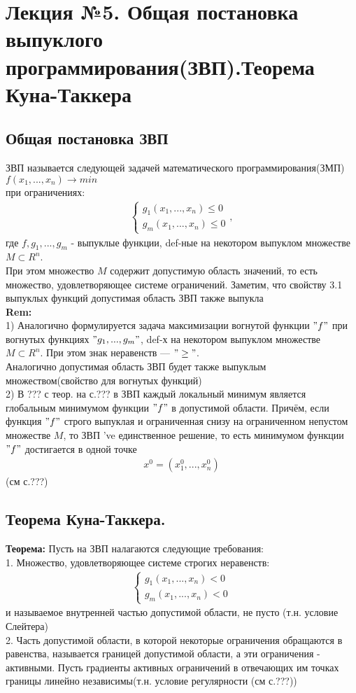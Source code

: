 \documentclass[a4paper]{article}
\newcommand{\eqn}[1]{\begin{equation*}\begin{aligned}{#1}\end{aligned}\end{equation*}} %
\begin{document}
\large %
\setlength{\baselineskip}{25pt}
\section*{Лекция №5. Общая постановка выпуклого программирования(ЗВП).Теорема Куна-Таккера}
\subsection*{Общая постановка ЗВП}
ЗВП называется следующей задачей математического программирования(ЗМП)\\
$f(x_1,...,x_n) \rightarrow min$\\
при ограничениях:
\eqn{
\begin{cases}
g_1(x_1,...,x_n) \leq 0 \\
g_m(x_1,...,x_n) \leq 0
\end{cases},}
где $f,g_1,...,g_m$ - выпуклые функции, def-ные на некотором выпуклом множестве $M\subset R^n$.\\
При этом множество $M$ содержит допустимую область значений, то есть множество, удовлетворяющее системе ограничений. Заметим, что свойству 3.1 выпуклых функций допустимая область ЗВП также выпукла \\
\textbf{Rem:}\\
1) Аналогично формулируется задача максимизации вогнутой функции $"f"$ при вогнутых функциях $"g_1,...,g_m"$, def-х на некотором выпуклом множестве $M\subset R^n$. При этом знак неравенств --- $"\geq"$.\\
Аналогично допустимая область ЗВП будет также выпуклым множеством(свойство для вогнутых функций)\\
2) В ??? с теор. на с.??? в ЗВП каждый локальный минимум является глобальным минимумом функции $"f"$ в допустимой области. Причём, если функция $"f"$ строго выпуклая и ограниченная снизу на ограниченном непустом множестве $M$, то ЗВП 've единственное решение, то есть минимумом функции $"f"$ достигается в одной точке
\eqn{x^0=(x^0_1,...,x_n^0)} (см с.???)
\newpage
\subsection*{Теорема Куна-Таккера.}
\textbf{Теорема:} Пусть на ЗВП налагаются следующие требования:\\
1. Множество, удовлетворяющее системе строгих неравенств:
\eqn{\begin{cases} g_1(x_1,...,x_n)<0 \\ g_m(x_1,...,x_n)<0\end{cases}}
и называемое внутренней частью допустимой области, не пусто (т.н. условие Слейтера) \\
2. Часть допустимой области, в которой некоторые ограничения обращаются в равенства, называется границей допустимой области, а эти ограничения - активными. Пусть градиенты активных ограничений в отвечающих им точках границы линейно независимы(т.н. условие регулярности (см с.???))\\
\newpage
\end{document}
